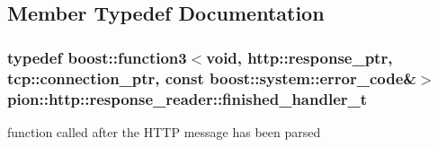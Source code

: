 \subsection{Member Typedef Documentation}
\hypertarget{classpion_1_1http_1_1response__reader_a5ca8a2f566ad6c5f6c6ae264d557944e}{
\subsubsection[{finished\-\_\-handler\-\_\-t}]{\setlength{\rightskip}{0pt plus 5cm}typedef boost\-::function3$<$void, {\bf http\-::response\-\_\-ptr}, {\bf tcp\-::connection\-\_\-ptr}, const boost\-::system\-::error\-\_\-code\&$>$ {\bf pion\-::http\-::response\-\_\-reader\-::finished\-\_\-handler\-\_\-t}}}\label{classpion_1_1http_1_1response__reader_a5ca8a2f566ad6c5f6c6ae264d557944e}


function called after the H\-T\-T\-P message has been parsed 



